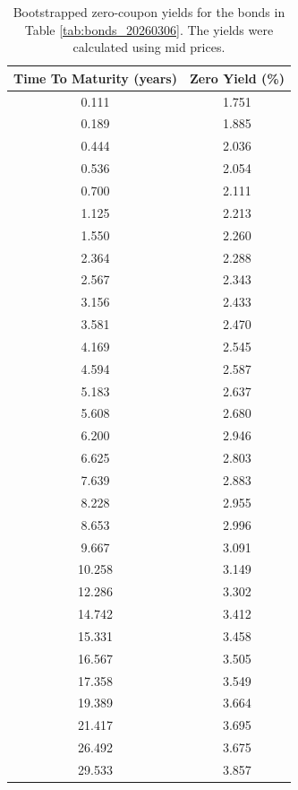 \documentclass[a4paper]{artikel3}
\numberwithin{equation}{section}
\numberwithin{theorem}{section}
\numberwithin{proposition}{section}
\numberwithin{lemma}{section}
\begin{document}
\begin{table}[h!]
    \centering
    \begin{tabular}{| c | c |} 
\hline
Time To Maturity (years) & Zero Yield (\%) \\
\hline
\hline
0.111 & 1.751 \\
\hline
0.189 & 1.885 \\
\hline
0.444 & 2.036 \\
\hline
0.536 & 2.054 \\
\hline
0.700 & 2.111 \\
\hline
1.125 & 2.213 \\
\hline
1.550 & 2.260 \\
\hline
2.364 & 2.288 \\
\hline
2.567 & 2.343 \\
\hline
3.156 & 2.433 \\
\hline
3.581 & 2.470 \\
\hline
4.169 & 2.545 \\
\hline
4.594 & 2.587 \\
\hline
5.183 & 2.637 \\
\hline
5.608 & 2.680 \\
\hline
6.200 & 2.946 \\
\hline
6.625 & 2.803 \\
\hline
7.639 & 2.883 \\
\hline
8.228 & 2.955 \\
\hline
8.653 & 2.996 \\
\hline
9.667 & 3.091 \\
\hline
10.258 & 3.149 \\
\hline
12.286 & 3.302 \\
\hline
14.742 & 3.412 \\
\hline
15.331 & 3.458 \\
\hline
16.567 & 3.505 \\
\hline
17.358 & 3.549 \\
\hline
19.389 & 3.664 \\
\hline
21.417 & 3.695 \\
\hline
26.492 & 3.675 \\
\hline
29.533 & 3.857 \\
\hline
    \end{tabular}
    \caption{Bootstrapped zero-coupon yields for the bonds in Table \ref{tab:bonds_20260306}. The yields were calculated using mid prices.}
    \label{tab:yields_20260306}
\end{table}
\end{document}

